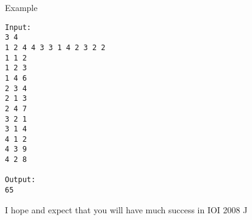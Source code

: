 Example
\begin{verbatim}
Input:
3 4
1 2 4 4 3 3 1 4 2 3 2 2
1 1 2
1 2 3
1 4 6
2 3 4
2 1 3
2 4 7
3 2 1
3 1 4
4 1 2
4 3 9
4 2 8

Output:
65
\end{verbatim}
I hope and expect that you will have much success in IOI 2008 ^^